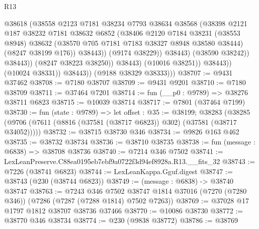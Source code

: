 \begin{lexlean}{R13}
\begin{coremodule}
                                  @38618
                                  (@38558
                                    @2123
                                    @7181
                                    @38234
                                    @7793
                                    @38634
                                    @38568
                                    (@38398
                                      @2121
                                      @187
                                      @38232
                                      @7181
                                      @38632
                                      @6852
                                      (@38406
                                        @2120
                                        @7184
                                        @38231
                                        (@38553 @8948)
                                        @38632
                                        (@38570 @705 @7181 @7183 @38327 @8948 @38580 @38444)
                                        (@8247 @38199 @176))
                                      @38443))
                                  (@9174 @38229))
                                @38443)
                              (@38590 @38242))
                            @38443))
                        (@8247 @38223 @38250))
                      @38443)
                    (@10016 @38251))
                  @38443))
              (@10024 @38331))
            @38443))
        (@9188 @38329 @38333)))
@38707 := @9431 @37462
@38708 := @7180 @38707
@38709 := @9431 @9201
@38710 := @7180 @38709
@38711 := @37464 @7201
@38714 := fun (__p0 : @9789) => @38276 @38711 @6823
@38715 := @10039 @38714
@38717 := @7801 (@37464 @7199)
@38730 := fun (state : @9789) =>
  let offset : @35 := @38199;
  @38283 (@38285 (@9706 (@7611 (@8816 (@37581 (@38717 @6823)) @302) (@37581 (@38717 @34052)))))
@38732 := @38715 @38730 @346
@38734 := @9826 @163 @462
@38735 := @38732 @38734
@38736 := @38710 @38735
@38738 := fun (message : @6838) => @38708 @38736
@38740 := @7214 @346 @7502
@38741 := LexLeanPreserve.C88ea0195eb7ebf9a0722f3d94ef8928a.R13.__fits_32
@38743 := @7226 (@38741 @6823)
@38744 := LexLeanKappa.Gguf.digest
@38747 := @38743 (@230 (@38744 @6823))
@38749 := (message : @6838) -> @38740 @38747
@38763 := @7243
    @346
    @7502
    @38747
    @1814
    @37016
    (@7270 (@7280 @346))
    (@7286 (@7287 (@7288 @1814) @7502 @7263))
@38769 := @37028 @17 @1797 @1812 @38707 @38736 @37466
@38770 := @10086 @38730
@38772 := @38770 @346 @38734
@38774 := @230 (@9838 @38772)
@38786 := @38769

\end{coremodule}
\end{lexlean}
